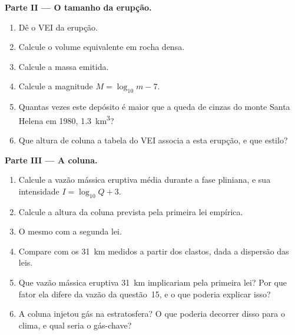 \begin{problem}
\noindent\textbf{Parte II --- O tamanho da erupção.}
\begin{enumerate}[resume]
\item Dê o VEI da erupção.
\item Calcule o volume equivalente em rocha densa.
\item Calcule a massa emitida.
\item Calcule a magnitude $M = \log_{10}m - 7$.
\item Quantas vezes este depósito é maior que a queda de cinzas do monte Santa Helena em 1980,
\qty{1.3}{km^3}?
\item Que altura de coluna a tabela do VEI associa a esta erupção, e
que estilo?
\end{enumerate}

\noindent\textbf{Parte III --- A coluna.}
\begin{enumerate}[resume]
\item Calcule a vazão mássica eruptiva média durante a fase pliniana, e sua
intensidade $I = \log_{10}Q + 3$.
\item Calcule a altura da coluna prevista pela primeira lei empírica.
\item O mesmo com a segunda lei.
\item Compare com os \qty{31}{km} medidos a partir dos clastos, dada a dispersão
das leis.
\item Que vazão mássica eruptiva \qty{31}{km} implicariam pela primeira lei? Por que
fator ela difere da vazão da questão~15, e o que poderia explicar isso?
\item A coluna injetou gás na estratosfera? O que poderia decorrer disso para o
clima, e qual seria o gás-chave?
\end{enumerate}


\end{problem}
